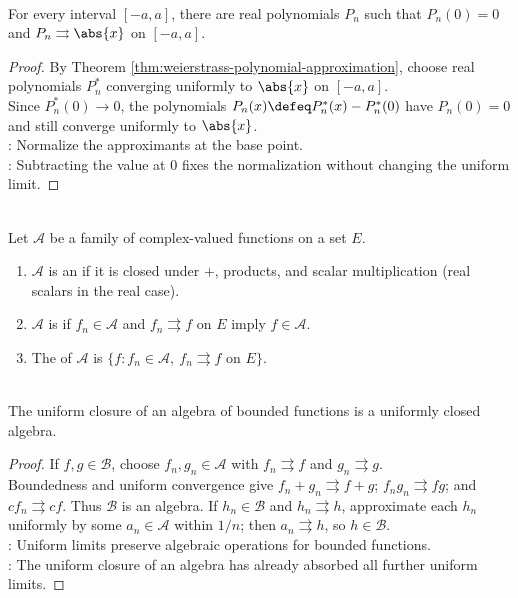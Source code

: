 \begin{corollary} \label{cor:absolute-value-polynomial-approximation} \\
For every interval $[-a,a]$, there are real polynomials $P_n$ such that $P_n(0)=0$ and $P_n\rightrightarrows \abs{x}$ on $[-a,a]$.
\begin{proof}
By Theorem \ref{thm:weierstrass-polynomial-approximation}, choose real polynomials $P_n^\ast$ converging uniformly to $\abs{x}$ on $[-a,a]$.\\
Since $P_n^\ast(0)\to0$, the polynomials $P_n(x)\defeq P_n^\ast(x)-P_n^\ast(0)$ have $P_n(0)=0$ and still converge uniformly to $\abs{x}$.\\
: Normalize the approximants at the base point.\\
: Subtracting the value at $0$ fixes the normalization without changing the uniform limit.
\end{proof}
\end{corollary}

\begin{definition} \label{def:algebra-uniform-closure-functions} \\
Let $\mathcal{A}$ be a family of complex-valued functions on a set $E$.
\begin{enumerate}[label=(\roman*)]
\setlength{\itemsep}{0pt}
\item $\mathcal{A}$ is an  if it is closed under $+$, products, and scalar multiplication (real scalars in the real case).
\item $\mathcal{A}$ is  if $f_n\in\mathcal{A}$ and $f_n\rightrightarrows f$ on $E$ imply $f\in\mathcal{A}$.
\item The  of $\mathcal{A}$ is $\{f:f_n\in\mathcal{A},\ f_n\rightrightarrows f\text{ on }E\}$.
\end{enumerate}
\end{definition}

\begin{theorem} \label{thm:uniform-closure-algebra} \\
The uniform closure of an algebra of bounded functions is a uniformly closed algebra.
\begin{proof}
If $f,g\in\mathcal{B}$, choose $f_n,g_n\in\mathcal{A}$ with $f_n\rightrightarrows f$ and $g_n\rightrightarrows g$.\\
Boundedness and uniform convergence give $f_n+g_n\rightrightarrows f+g$; $f_ng_n\rightrightarrows fg$; and $cf_n\rightrightarrows cf$.
Thus $\mathcal{B}$ is an algebra. If $h_n\in\mathcal{B}$ and $h_n\rightrightarrows h$, approximate each $h_n$ uniformly by some $a_n\in\mathcal{A}$ within $1/n$; then $a_n\rightrightarrows h$, so $h\in\mathcal{B}$.\\
: Uniform limits preserve algebraic operations for bounded functions.\\
: The uniform closure of an algebra has already absorbed all further uniform limits.
\end{proof}
\end{theorem}


